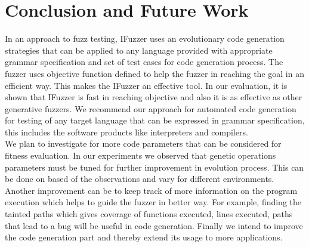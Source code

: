 \documentclass{acm_proc_article-sp}
\begin{document}
\section{Conclusion and Future Work} \label{conclusion}
In an approach to fuzz testing, IFuzzer uses an evolutionary code generation strategies that can be applied to any language provided with appropriate grammar specification and set of test cases for code generation process. The fuzzer uses objective function defined to help the fuzzer in reaching the goal in an efficient way. This makes the IFuzzer an effective tool. In our evaluation, it is shown that IFuzzer is fast in reaching objective and also it is as effective as other generative fuzzers. We recommend our approach for automated code generation for testing of any target language that can be expressed in grammar specification, this includes the software products like interpreters and compilers.\\
\indent We plan to investigate for more code parameters that can be considered for fitness evaluation. In our experiments we observed that genetic operations parameters must be tuned for further improvement in evolution process. This can be done on based of the observations and vary for different environments. Another improvement can be to keep track of more information on the program execution which helps to guide the fuzzer in better way. For example,  finding the tainted paths which gives coverage of functions executed, lines executed, paths that lead to a bug will be useful in code generation. Finally we intend to improve the code generation part and thereby extend its usage to more applications.

%




\appendix
\end{document}

